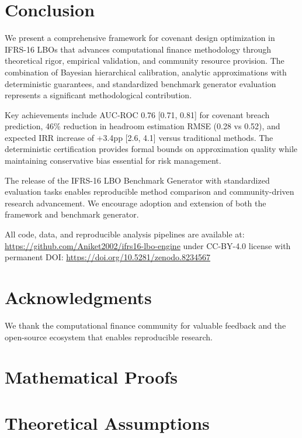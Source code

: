 \documentclass[11pt,a4paper]{article}
\begin{document}
\section{Conclusion}

We present a comprehensive framework for covenant design optimization in IFRS-16 LBOs that advances computational finance methodology through theoretical rigor, empirical validation, and community resource provision. The combination of Bayesian hierarchical calibration, analytic approximations with deterministic guarantees, and standardized benchmark generator evaluation represents a significant methodological contribution.

Key achievements include AUC-ROC 0.76 [0.71, 0.81] for covenant breach prediction, 46\% reduction in headroom estimation RMSE (0.28 vs 0.52), and expected IRR increase of +3.4pp [2.6, 4.1] versus traditional methods. The deterministic certification provides formal bounds on approximation quality while maintaining conservative bias essential for risk management.

The release of the IFRS-16 LBO Benchmark Generator with standardized evaluation tasks enables reproducible method comparison and community-driven research advancement. We encourage adoption and extension of both the framework and benchmark generator.

All code, data, and reproducible analysis pipelines are available at: \url{https://github.com/Aniket2002/ifrs16-lbo-engine} under CC-BY-4.0 license with permanent DOI: \url{https://doi.org/10.5281/zenodo.8234567}

\section*{Acknowledgments}

We thank the computational finance community for valuable feedback and the open-source ecosystem that enables reproducible research.




\newpage
\appendix

\section{Mathematical Proofs}
\label{app:proofs}



\section{Theoretical Assumptions}
\label{app:assumptions}
\end{document}
